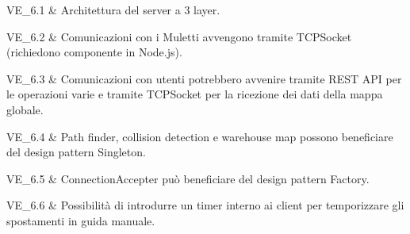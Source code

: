 VE\_6.1 & Architettura del server a 3 layer.

\tabularnewline
VE\_6.2 & Comunicazioni con i Muletti avvengono tramite TCPSocket (richiedono componente in Node.js).

\tabularnewline
VE\_6.3 & Comunicazioni con utenti potrebbero avvenire tramite REST API per le operazioni varie e tramite TCPSocket per la ricezione dei dati della mappa globale.

\tabularnewline
VE\_6.4 & Path finder, collision detection e warehouse map possono beneficiare del design pattern Singleton.

\tabularnewline
VE\_6.5 & ConnectionAccepter può beneficiare del design pattern Factory.

\tabularnewline
VE\_6.6 & Possibilità di introdurre un timer interno ai client per temporizzare gli spostamenti in guida manuale.
